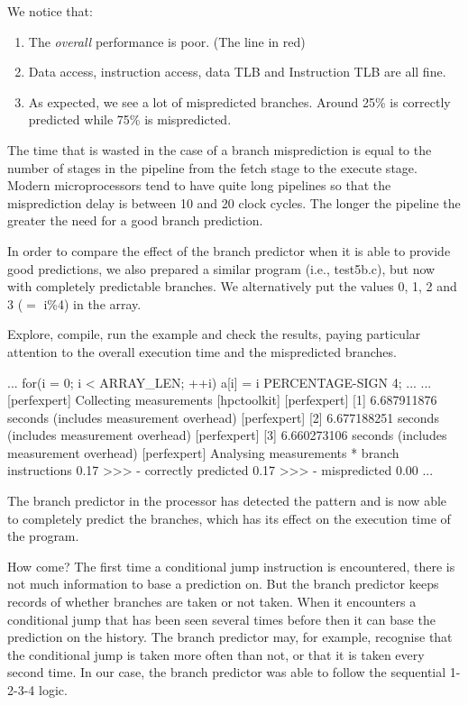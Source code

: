 We notice that:

\begin{enumerate}
  \item  The \emph{overall} performance is poor. (The line in red)
  \item  Data access, instruction access, data TLB and Instruction TLB are all fine.
  \item  As expected, we see a lot of mispredicted branches. Around 25\% is correctly predicted while 75\% is mispredicted.
\end{enumerate}

The time that is wasted in the case of a branch misprediction is equal to the number of stages in the pipeline from the fetch stage to the execute stage. Modern microprocessors tend to have quite long pipelines so that the misprediction delay is between 10 and 20 clock cycles. The longer the pipeline the greater the need for a good branch prediction.

In order to compare the effect of the branch predictor when it is able to provide good predictions, we also prepared a similar program (i.e., test5b.c), but now with completely predictable branches. We alternatively put the values 0, 1, 2 and 3 ($=$ i\%4) in the array.

Explore, compile, run the example and check the results, paying particular attention to the overall execution time and the mispredicted branches.

\begin{prompt}
...
 for(i = 0; i <{} ARRAY\_LEN; ++i)
   a[i] = i PERCENTAGE-SIGN 4;
...
...
[perfexpert] Collecting measurements [hpctoolkit]
[perfexpert]    [1] 6.687911876 seconds (includes measurement overhead)
[perfexpert]    [2] 6.677188251 seconds (includes measurement overhead)
[perfexpert]    [3] 6.660273106 seconds (includes measurement overhead)
[perfexpert] Analysing measurements
* branch instructions   0.17 >>>
 - correctly predicted  0.17 >>>
 - mispredicted         0.00
...
\end{prompt}

The branch predictor in the processor has detected the pattern and is now able to completely predict the branches, which has its effect on the execution time of the program.

How come? The first time a conditional jump instruction is encountered, there is not much information to base a prediction on. But the branch predictor keeps records of whether branches are taken or not taken. When it encounters a conditional jump that has been seen several times before then it can base the prediction on the history. The branch predictor may, for example, recognise that the conditional jump is taken more often than not, or that it is taken every second time. In our case, the branch predictor was able to follow the sequential 1-2-3-4 logic.

